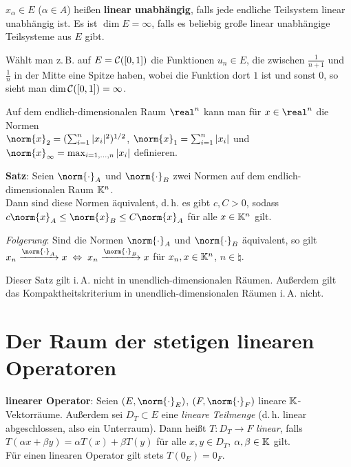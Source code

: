 $x_\alpha \in E$ ($\alpha \in A$) heißen \textbf{linear unabhängig}, falls
jede endliche Teilsystem linear unabhängig ist.
Es ist $\dim E = \infty$, falls es beliebig große linear unabhängige
Teilsysteme aus $E$ gibt.

Wählt man z.\,B. auf $E = \mathcal{C}([0,1])$ die Funktionen $u_n \in E$, die
zwischen $\frac{1}{n + 1}$ und $\frac{1}{n}$ in der Mitte eine Spitze haben,
wobei die Funktion dort $1$ ist und sonst $0$, so sieht man
$\dim \mathcal{C}([0,1]) = \infty$.

\linie

Auf dem endlich-dimensionalen Raum $\real^n$ kann man für $x \in \real^n$
die Normen \\
$\norm{x}_2 = (\sum_{i=1}^n |x_i|^2)^{1/2}$, \quad
$\norm{x}_1 = \sum_{i=1}^n |x_i|$ \; und \;
$\norm{x}_\infty = \max_{i = 1, \dotsc, n} |x_i|$ definieren.

\textbf{Satz}:
Seien $\norm{\cdot}_A$ und $\norm{\cdot}_B$ zwei Normen auf dem
endlich-dimensionalen Raum $\mathbb{K}^n$. \\
Dann sind diese Normen äquivalent, d.\,h. es gibt $c, C > 0$, sodass
$c \norm{x}_A \le \norm{x}_B \le C \norm{x}_A$ für alle $x \in \mathbb{K}^n$ gilt.

\emph{Folgerung}:
Sind die Normen $\norm{\cdot}_A$ und $\norm{\cdot}_B$ äquivalent, so gilt
$x_n \xrightarrow{\norm{\cdot}_A} x \;\Leftrightarrow\;
x_n \xrightarrow{\norm{\cdot}_B} x$ für $x_n, x \in \mathbb{K}^n$,
$n \in \natural$.

Dieser Satz gilt i.\,A. nicht in unendlich-dimensionalen Räumen.
Außerdem gilt das Kompaktheitskriterium in unendlich-dimensionalen
Räumen i.\,A. nicht.

\pagebreak

\section{%
    Der Raum der stetigen linearen Operatoren%
}

\textbf{linearer Operator}:
Seien $(E, \norm{\cdot}_E)$, $(F, \norm{\cdot}_F)$ lineare
$\mathbb{K}$-Vektorräume.
Außerdem sei $D_T \subset E$ eine \emph{lineare Teilmenge}
(d.\,h. linear abgeschlossen, also ein Unterraum).
Dann heißt $T: D_T \rightarrow F$ \emph{linear}, falls
$T(\alpha x + \beta y) = \alpha T(x) + \beta T(y)$ für alle
$x, y \in D_T$, $\alpha, \beta \in \mathbb{K}$ gilt. \\
Für einen linearen Operator gilt stets $T(0_E) = 0_F$.

\linie

